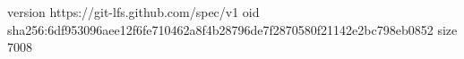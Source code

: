 version https://git-lfs.github.com/spec/v1
oid sha256:6df953096aee12f6fe710462a8f4b28796de7f2870580f21142e2bc798eb0852
size 7008
